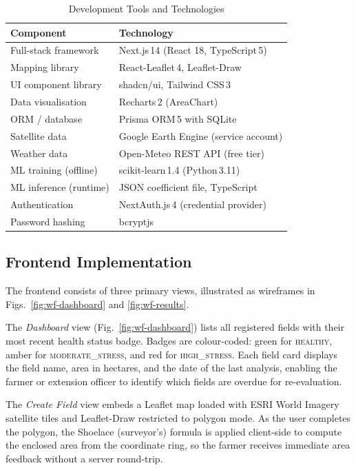 \documentclass[conference]{IEEEtran}
\begin{document}
\begin{table}[!t]
\caption{Development Tools and Technologies}
\label{tab:tools}
\centering
\footnotesize
\setlength{\tabcolsep}{4pt}
\begin{tabular}{p{2.1cm}p{5.5cm}}
\toprule
\textbf{Component}       & \textbf{Technology} \\
\midrule
Full-stack framework     & Next.js\,14 (React 18, TypeScript\,5) \\
Mapping library          & React-Leaflet\,4, Leaflet-Draw \\
UI component library     & shadcn/ui, Tailwind CSS\,3 \\
Data visualisation       & Recharts\,2 (AreaChart) \\
ORM / database           & Prisma ORM\,5 with SQLite \\
Satellite data           & Google Earth Engine (service account) \\
Weather data             & Open-Meteo REST API (free tier) \\
ML training (offline)    & scikit-learn\,1.4 (Python\,3.11) \\
ML inference (runtime)   & JSON coefficient file, TypeScript \\
Authentication           & NextAuth.js\,4 (credential provider) \\
Password hashing         & bcryptjs \\
\bottomrule
\end{tabular}
\end{table}

\subsection{Frontend Implementation}

The frontend consists of three primary views, illustrated as wireframes
in Figs.~\ref{fig:wf-dashboard} and \ref{fig:wf-results}.

The \textit{Dashboard} view (Fig.~\ref{fig:wf-dashboard}) lists all
registered fields with their most recent health status badge.
Badges are colour-coded: green for \textsc{healthy}, amber for
\textsc{moderate\_stress}, and red for \textsc{high\_stress}. Each field
card displays the field name, area in hectares, and the date of the last
analysis, enabling the farmer or extension officer to identify which
fields are overdue for re-evaluation.

The \textit{Create Field} view embeds a Leaflet map loaded with ESRI
World Imagery satellite tiles and Leaflet-Draw restricted to polygon
mode. As the user completes the polygon, the Shoelace (surveyor's)
formula is applied client-side to compute the enclosed area from the
coordinate ring, so the farmer receives immediate area feedback without a
server round-trip.
\end{document}

